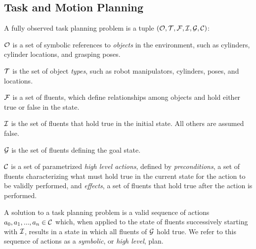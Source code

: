 \subsection{Task and Motion Planning}
A fully observed task planning problem is a tuple $(\mathcal{O}, \mathcal{T}, \mathcal{F}, \mathcal{I}, \mathcal{G}, \mathcal{C})$:
\begin{tightlist}
\item $\mathcal{O}$ is a set of symbolic references to \emph{objects} in the environment,
such as cylinders, cylinder locations, and grasping poses.
\item $\mathcal{T}$ is the set of object \emph{types}, such as robot manipulators, cylinders, poses, and locations.
\item $\mathcal{F}$ is a set of fluents, which define relationships among objects and hold either
true or false in the state.
\item $\mathcal{I}$ is the set of fluents that hold true in the initial state. All others are assumed false.
\item $\mathcal{G}$ is the set of fluents defining the goal state.
\item $\mathcal{C}$ is a set of parametrized \emph{high level actions}, defined by \emph{preconditions}, a set
of fluents characterizing what must hold true in the current state for the action
to be validly performed, and \emph{effects}, a set of fluents that hold true after
the action is performed.
\end{tightlist}
A solution to a task planning problem is a valid sequence of actions
$a_{0}, a_{1}, ..., a_{n} \in \mathcal{C}$ which, when applied to the state of fluents
successively starting with $\mathcal{I}$, results in a state in which all fluents of
$\mathcal{G}$ hold true. We refer to this sequence of actions as a \emph{symbolic}, or
\emph{high level}, plan.



